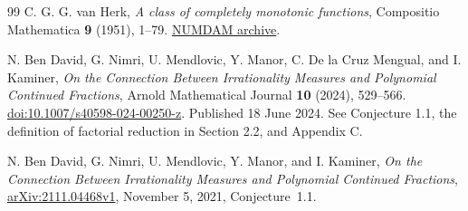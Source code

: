 \documentclass[11pt,a4paper]{article}
\theoremstyle{definition}
\theoremstyle{remark}
\numberwithin{equation}{section}
\begin{document}
\begin{thebibliography}{99}
C. G. G. van Herk,
\emph{A class of completely monotonic functions},
Compositio Mathematica \textbf{9} (1951), 1--79.
\href{https://www.numdam.org/item/CM_1951__9__1_0/}{NUMDAM archive}.

N. Ben David, G. Nimri, U. Mendlovic, Y. Manor,
C. De la Cruz Mengual, and I. Kaminer,
\emph{On the Connection Between Irrationality Measures and
Polynomial Continued Fractions},
Arnold Mathematical Journal \textbf{10} (2024), 529--566.
\href{https://doi.org/10.1007/s40598-024-00250-z}
{doi:10.1007/s40598-024-00250-z}.
Published 18 June 2024. See Conjecture 1.1, the definition of
factorial reduction in Section 2.2, and Appendix C.

N. Ben David, G. Nimri, U. Mendlovic, Y. Manor, and I. Kaminer,
\emph{On the Connection Between Irrationality Measures and Polynomial
Continued Fractions},
\href{https://arxiv.org/abs/2111.04468v1}{arXiv:2111.04468v1},
November 5, 2021, Conjecture~1.1.

\end{thebibliography}
\end{document}
